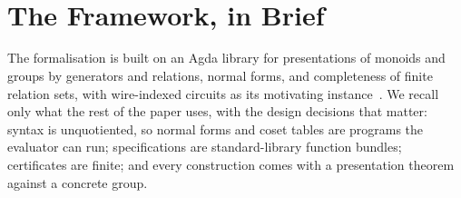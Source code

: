 \begin{code}[hide]
\AgdaSymbol{:}\AgdaSpace{}%
\AgdaSpace{}%
\<%
\\
%
\>[2]\AgdaSpace{}%
\AgdaSymbol{:}\AgdaSpace{}%
\AgdaSpace{}%
\<%
\\
%
\>[2]\AgdaSpace{}%
\AgdaSpace{}%
\AgdaSymbol{:}\AgdaSpace{}%
\<%
\\
%
\>[2]\AgdaSpace{}%
\AgdaSymbol{:}\AgdaSpace{}%
\AgdaSpace{}%
\AgdaSpace{}%
\AgdaSpace{}%
\AgdaSpace{}%
\AgdaSpace{}%
\<%
\\
%
\>[2]\AgdaSpace{}%
\AgdaSymbol{:}\AgdaSpace{}%
\AgdaSpace{}%
\AgdaSpace{}%
\<%
\\
%
\>[2]\AgdaSpace{}%
\AgdaSymbol{:}\AgdaSpace{}%
\AgdaSpace{}%
\AgdaSpace{}%
\AgdaSpace{}%
\AgdaSpace{}%
\<%
\\
%
\>[2]\AgdaSpace{}%
\AgdaSymbol{:}\AgdaSpace{}%
\AgdaSpace{}%
\AgdaSpace{}%
\AgdaSpace{}%
\AgdaSpace{}%
\<%
\\
%
\\[\AgdaEmptyExtraSkip]%
\>[0]\AgdaSpace{}%
\AgdaSpace{}%
\AgdaSymbol{:}\AgdaSpace{}%
\AgdaSpace{}%
\<%
\\
\>[0][@{}l@{\AgdaIndent{0}}]%
\>[2]\AgdaSpace{}%
\AgdaSpace{}%
\AgdaSymbol{:}\AgdaSpace{}%
\AgdaSpace{}%
\AgdaSpace{}%
\AgdaSpace{}%
\<%
\end{code}
\section{The Framework, in Brief}\label{sec:framework}

The formalisation is built on an Agda library for presentations of
monoids and groups by generators and relations, normal forms, and
completeness of finite relation sets, with wire-indexed circuits as its
motivating instance~\cite{bian2026framework,qupit-code}.  We recall only
what the rest of the paper uses, with the design decisions that
matter: syntax is unquotiented, so normal forms and coset tables are
programs the evaluator can run; specifications are standard-library
function bundles; certificates are finite; and every construction comes
with a presentation theorem against a concrete group.

